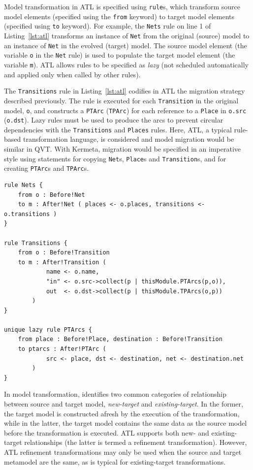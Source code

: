 Model transformation in ATL is specified using \texttt{rule}s, which transform source model elements (specified using the \texttt{fr\-om} keyword) to target model elements (specified using \texttt{to} keyword). For example, the \texttt{Nets} rule on line 1 of Listing~\ref{lst:atl} transforms an instance of \texttt{Net} from the original (source) model to an instance of \texttt{Net} in the evolved (target) model. The source model element (the variable \texttt{o} in the \texttt{Net} rule) is used to populate the target model element (the variable \texttt{m}). ATL allows rules to be specified as \emph{lazy} (not scheduled automatically and applied only when called by other rules).

The \texttt{Transitions} rule in Listing~\ref{lst:atl} codifies in ATL the migration strategy described previously. The rule is executed for each \texttt{Transition} in the original model, \texttt{o}, and constructs a \texttt{PTArc} (\texttt{TPArc}) for each reference to a \texttt{Place} in \texttt{o.src} (\texttt{o.dst}). Lazy rules must be used to produce the arcs to prevent circular dependencies with the \texttt{Transitions} and \texttt{Places} rules. Here, ATL, a typical rule-based transformation language, is considered and model migration would be similar in QVT. With Kermeta, migration would be specified in an imperative style using statements for copying \texttt{Net}s, \texttt{Place}s and \texttt{Transition}s, and for creating \texttt{PTArc}s and \texttt{TPArc}s.

\begin{lstlisting}[caption=Fragment of the Petri nets model migration in ATL, label=lst:atl, language=ATL]
rule Nets {
	from o : Before!Net
	to m : After!Net ( places <- o.places, transitions <- o.transitions )
}

rule Transitions {
	from o : Before!Transition
	to m : After!Transition (
			name <- o.name,
			"in" <- o.src->collect(p | thisModule.PTArcs(p,o)),
			out  <- o.dst->collect(p | thisModule.TPArcs(o,p))
		)
}

unique lazy rule PTArcs {
	from place : Before!Place, destination : Before!Transition
	to ptarcs : After!PTArc (
			src <- place, dst <- destination, net <- destination.net
		)
}
\end{lstlisting}

In model transformation, \cite{czarnecki06survey} identifies two common categories of relationship between source and target model, \emph{new-target} and \emph{existing-target}. In the former, the target model is constructed afresh by the execution of the transformation, while in the latter, the target model contains the same data as the source model before the transformation is executed. ATL supports both new- and existing-target relationships (the latter is termed a refinement transformation). However, ATL refinement transformations may only be used when the source and target metamodel are the same, as is typical for existing-target transformations. 

